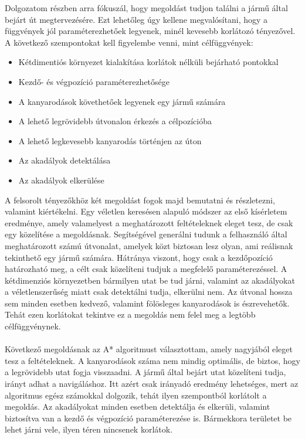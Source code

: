 

Dolgozatom részben arra fókuszál, hogy megoldást tudjon találni a jármű által bejárt út megtervezésére. Ezt lehetőleg úgy kellene megvalósítani, hogy a függvények jól paraméterezhetőek legyenek, minél kevesebb korlátozó tényezővel. A következő szempontokat kell figyelembe venni, mint célfüggvények:
\begin{itemize}
	\item Kétdimentiós környezet kialakítása korlátok nélküli bejárható pontokkal
	\item Kezdő- és végpozíció paraméterezhetősége
	\item A kanyarodások követhetőek legyenek egy jármű számára
	\item A lehető legrövidebb útvonalon érkezés a célpozícióba
	\item A lehető legkevesebb kanyarodás történjen az úton
	\item Az akadályok detektálása
	\item Az akadályok elkerülése
\end{itemize}

A felsorolt tényezőkhöz két megoldást fogok majd bemutatni és részletezni, valamint kiértékelni. Egy véletlen keresésen alapuló módszer az első kísérletem eredménye, amely valamelyest a meghatározott feltételeknek eleget tesz, de csak egy közelítése a megoldásnak. Segítségével generálni tudunk a felhasználó által meghatározott számú útvonalat, amelyek közt biztosan lesz olyan, ami reálisnak tekinthető egy jármű számára. Hátránya viszont, hogy csak a kezdőpozíció határozható meg, a célt csak közelíteni tudjuk a megfelelő paraméterezéssel. A kétdimenziós környezetben bármilyen utat be tud járni, valamint az akadályokat a véletlenszerűség miatt csak detektálni tudja, elkerülni nem. Az útvonal hossza sem minden esetben kedvező, valamint fölösleges kanyarodások is észrevehetők. Tehát ezen korlátokat tekintve ez a megoldás nem felel meg a legtöbb célfüggvénynek.
\\\\

Következő megoldásnak az A* algoritmust választottam, amely nagyjából eleget tesz a feltételeknek. A kanyarodások száma nem mindig optimális, de biztos, hogy a legrövidebb utat fogja visszaadni. A jármű által bejárt utat közelíteni tudja, irányt adhat a navigáláshoz. Itt azért csak irányadó eredmény lehetséges, mert az algoritmus egész számokkal dolgozik, tehát ilyen szempontból korlátolt a megoldás. Az akadályokat minden esetben detektálja és elkerüli, valamint biztosítva van a kezdő és végpozíció paraméterezése is. Bármekkora területet be lehet járni vele, ilyen téren nincsenek korlátok.  

